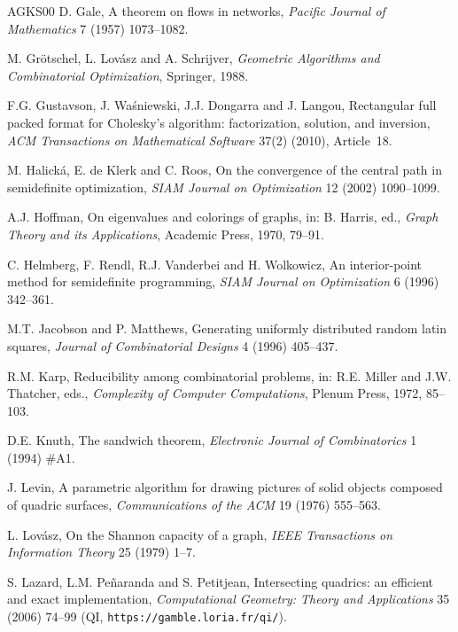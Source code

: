 \documentclass[11pt]{article}
\theoremstyle{definition}
\theoremstyle{remark}
\begin{document}
\begin{thebibliography}{AGKS00}
  D. Gale,
  A theorem on flows in networks,
  {\em Pacific Journal of Mathematics\/} 7 (1957) 1073--1082.

  M. Gr\"otschel, L. Lov\'asz and A. Schrijver,
  {\em Geometric Algorithms and Combinatorial Optimization\/},
  Springer, 1988.

  F.G. Gustavson, J. Wa\'sniewski, J.J. Dongarra and J. Langou,
  Rectangular full packed format for Cholesky's algorithm: factorization,
  solution, and inversion,
  {\em ACM Transactions on Mathematical Software\/} 37(2) (2010), Article~18.

  M. Halick\'a, E. de Klerk and C. Roos,
  On the convergence of the central path in semidefinite optimization,
  {\em SIAM Journal on Optimization\/} 12 (2002) 1090--1099.

  A.J. Hoffman,
  On eigenvalues and colorings of graphs,
  in: B. Harris, ed., {\em Graph Theory and its Applications\/},
  Academic Press, 1970, 79--91.

  C. Helmberg, F. Rendl, R.J. Vanderbei and H. Wolkowicz,
  An interior-point method for semidefinite programming,
  {\em SIAM Journal on Optimization\/} 6 (1996) 342--361.

  M.T. Jacobson and P. Matthews,
  Generating uniformly distributed random latin squares,
  {\em Journal of Combinatorial Designs\/} 4 (1996) 405--437.

  R.M. Karp,
  Reducibility among combinatorial problems,
  in: R.E. Miller and J.W. Thatcher, eds., {\em Complexity of Computer
  Computations\/}, Plenum Press, 1972, 85--103.

  D.E. Knuth,
  The sandwich theorem,
  {\em Electronic Journal of Combinatorics\/} 1 (1994) \#A1.

  J. Levin,
  A parametric algorithm for drawing pictures of solid objects composed of
  quadric surfaces,
  {\em Communications of the ACM\/} 19 (1976) 555--563.

  L. Lov\'asz,
  On the Shannon capacity of a graph,
  {\em IEEE Transactions on Information Theory\/} 25 (1979) 1--7.

  S. Lazard, L.M. Pe\~naranda and S. Petitjean,
  Intersecting quadrics: an efficient and exact implementation,
  {\em Computational Geometry: Theory and Applications\/} 35 (2006) 74--99
  (QI, \texttt{https://gamble.loria.fr/qi/}).


\end{thebibliography}
\end{document}
